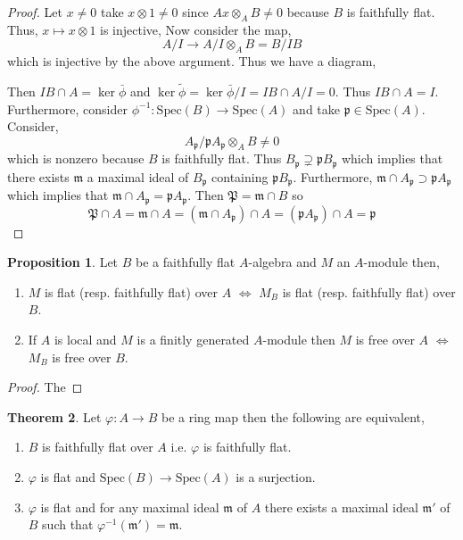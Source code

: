 \documentclass[12pt]{article}
\newcommand{\spec}[1]{\mathrm{Spec}\left( #1 \right)}
\newcommand{\p}{\mathfrak{p}}
\newcommand{\m}{\mathfrak{m}}
\theoremstyle{remark}
\theoremstyle{definition}
\newtheorem{theorem}{Theorem}[section]
\newtheorem{proposition}[theorem]{Proposition}
\begin{document}
\begin{proof}
Let $x \neq 0$ take $x \otimes 1 \neq 0$ since $A x \otimes_A B \neq 0$ because $B$ is faithfully flat. Thus, $x \mapsto x \otimes 1$ is injective, Now consider the map,
\[ A / I \to A / I \otimes_A B = B / IB \]
which is injective by the above argument. Thus we have a diagram,
\begin{center}
\end{center}
Then $IB \cap A = \ker{ \bar{\phi}}$ and $\ker{\tilde{\phi}} = \ker{\bar{\phi}} / I = IB \cap A / I = 0$. Thus $I B \cap A = I$. 
Furthermore, consider $\phi^{-1} : \spec{B} \to \spec{A}$ and take $\p \in \spec{A}$. Consider,
\[ A_\p / \p A_\p \otimes_A B \neq 0 \]
which is nonzero because $B$ is faithfully flat. Thus $B_\p \supsetneq \p B_\p$ which implies that there exists $\m$ a maximal ideal of $B_\p$ containing $\p B_\p$. Furthermore, $\m \cap A_\p \supset \p A_\p$ which implies that $\m \cap A_\p = \p A_\p$. Then $\mathfrak{P} = \m \cap B$ so 
\[ \mathfrak{P} \cap A = \m \cap A = (\m \cap A_\p) \cap A = (\p A_\p) \cap A = \p \]
\end{proof}

\begin{proposition}
Let $B$ be a faithfully flat $A$-algebra and $M$ an $A$-module then,
\begin{enumerate}
\item $M$ is flat (resp. faithfully flat) over $A$ $\iff$ $M_B$ is flat (resp. faithfully flat) over $B$.
\item If $A$ is local and $M$ is a finitly generated $A$-module then $M$ is free over $A$ $\iff$ $M_B$ is free over $B$.   
\end{enumerate}
\end{proposition}

\begin{proof}
The 
\end{proof}

\begin{theorem}
Let $\varphi : A \to B$ be a ring map then the following are equivalent,
\begin{enumerate}
\item $B$ is faithfully flat over $A$ i.e. $\varphi$ is faithfully flat.

\item $\varphi$ is flat and $\spec{B} \to \spec{A}$ is a surjection.

\item $\varphi$ is flat and for any maximal ideal $\m$ of $A$ there exists a maximal ideal $\m'$ of $B$ such that $\varphi^{-1}(\m') = \m$.
\end{enumerate}
\end{theorem}
\end{document}
